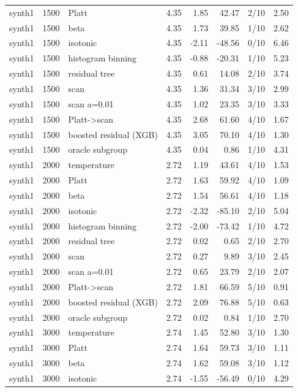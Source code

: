 \begin{tabular}{lllrrrlr}
synth1 & 1500 & Platt & 4.35 & 1.85 & 42.47 & 2/10 & 2.50 \\
synth1 & 1500 & beta & 4.35 & 1.73 & 39.85 & 1/10 & 2.62 \\
synth1 & 1500 & isotonic & 4.35 & -2.11 & -48.56 & 0/10 & 6.46 \\
synth1 & 1500 & histogram binning & 4.35 & -0.88 & -20.31 & 1/10 & 5.23 \\
synth1 & 1500 & residual tree & 4.35 & 0.61 & 14.08 & 2/10 & 3.74 \\
synth1 & 1500 & scan & 4.35 & 1.36 & 31.34 & 3/10 & 2.99 \\
synth1 & 1500 & scan a=0.01 & 4.35 & 1.02 & 23.35 & 3/10 & 3.33 \\
synth1 & 1500 & Platt->scan & 4.35 & 2.68 & 61.60 & 4/10 & 1.67 \\
synth1 & 1500 & boosted residual (XGB) & 4.35 & 3.05 & 70.10 & 4/10 & 1.30 \\
synth1 & 1500 & oracle subgroup & 4.35 & 0.04 & 0.86 & 1/10 & 4.31 \\
synth1 & 2000 & temperature & 2.72 & 1.19 & 43.61 & 4/10 & 1.53 \\
synth1 & 2000 & Platt & 2.72 & 1.63 & 59.92 & 4/10 & 1.09 \\
synth1 & 2000 & beta & 2.72 & 1.54 & 56.61 & 4/10 & 1.18 \\
synth1 & 2000 & isotonic & 2.72 & -2.32 & -85.10 & 2/10 & 5.04 \\
synth1 & 2000 & histogram binning & 2.72 & -2.00 & -73.42 & 1/10 & 4.72 \\
synth1 & 2000 & residual tree & 2.72 & 0.02 & 0.65 & 2/10 & 2.70 \\
synth1 & 2000 & scan & 2.72 & 0.27 & 9.89 & 3/10 & 2.45 \\
synth1 & 2000 & scan a=0.01 & 2.72 & 0.65 & 23.79 & 2/10 & 2.07 \\
synth1 & 2000 & Platt->scan & 2.72 & 1.81 & 66.59 & 5/10 & 0.91 \\
synth1 & 2000 & boosted residual (XGB) & 2.72 & 2.09 & 76.88 & 5/10 & 0.63 \\
synth1 & 2000 & oracle subgroup & 2.72 & 0.02 & 0.84 & 1/10 & 2.70 \\
synth1 & 3000 & temperature & 2.74 & 1.45 & 52.80 & 3/10 & 1.30 \\
synth1 & 3000 & Platt & 2.74 & 1.64 & 59.73 & 3/10 & 1.11 \\
synth1 & 3000 & beta & 2.74 & 1.62 & 59.08 & 3/10 & 1.12 \\
synth1 & 3000 & isotonic & 2.74 & -1.55 & -56.49 & 0/10 & 4.29 \\

\end{tabular}
